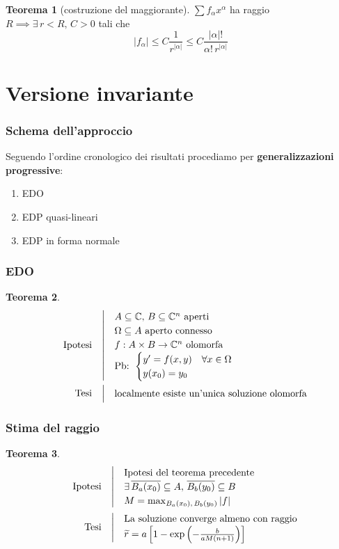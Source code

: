 \documentclass[serif,notheorems]{beamer}
\makeatletter
\newenvironment{ipotesi}%
{\quad\left|\quad\def\arraystretch{1.2}\begin{array}{@{}l@{}}}%
{\end{array}\right.}
\newcommand{\hpth}[2]
{
\begin{align*}
\quad
\text{Ipotesi}
&\begin{ipotesi}
#1
\end{ipotesi}\\
\text{Tesi}
&\begin{ipotesi}
#2
\end{ipotesi}
\end{align*}
}
\theoremstyle{definition} %
\newtheorem{theorem}{Teorema}[section] %
\theoremstyle{remark}
\makeatother
\begin{document}
\begin{frame}
\begin{theorem}[costruzione del maggiorante]
$\sum f_\alpha x^\alpha$ ha raggio $R \implies \exists \, r<R, \, C>0$ tali che 
$$|f_\alpha | \leq C \frac{1}{r^{|\alpha |}} \leq C \frac{|\alpha |!}{\alpha ! \, r^{|\alpha |}}$$
\end{theorem}
\end{frame}


\section{Versione invariante}

\begin{frame}
\frametitle{Schema dell'approccio}
Seguendo l'ordine cronologico dei risultati procediamo per \textbf{generalizzazioni progressive}:
\begin{enumerate}
\item EDO
\item EDP quasi-lineari
\item EDP in forma normale
\end{enumerate}
\end{frame}


\begin{frame}
\frametitle{EDO}
\begin{theorem}
\hpth{
A \subseteq \mathbb{C}, \, B\subseteq \mathbb{C}^n \text{ aperti }\\
\Omega \subseteq A \text{ aperto connesso}\\
f:A\times B\rightarrow\mathbb{C}^n \text{ olomorfa}\\
\text{Pb: }
\begin{cases}
y' = f(x,y) \quad \forall x \in \Omega \\
y(x_0)=y_0
\end{cases}\\
}
{
\text{localmente esiste un'unica soluzione olomorfa}
}
\end{theorem}
\end{frame}

\begin{frame}
\frametitle{Stima del raggio}
\begin{theorem}
\hpth{
\text{Ipotesi del teorema precedente}\\
\exists \, \overline{B_a(x_0)}\subseteq A,\,\overline{B_b(y_0)} \subseteq B\\
M=\max_{B_a(x_0),\, B_b(y_0)}|f|\\
}{
\text{La soluzione converge almeno con raggio} \\
\widetilde{r}= a\left[ 1-\exp\left( -\frac{b}{aM(n+1)}\right) \right] \\
}
\end{theorem}
\end{frame}
\end{document}
